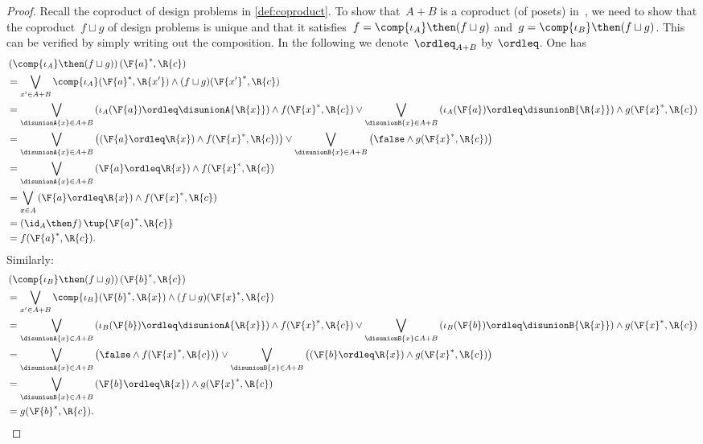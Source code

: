 \begin{proof}
	Recall the coproduct of design problems in \cref{def:coproduct}.
	To show that~$A+B$ is a coproduct (of posets) in~\DP, we need to show that the coproduct~$f \sqcup g$ of design problems is unique and that it satisfies~$f = \comp{\iota_A} \then (f \sqcup g)$ and~$g = \comp{\iota_B} \then (f \sqcup g)$.
	This can be verified by simply writing out the composition.
	In the following we denote~$\ordleq_{A+B}$ by $\ordleq$.
	One has
	\begin{equation}
		\begin{aligned}
			 & \left(\comp{\iota_A}\then (f\sqcup g)\right)(\F{a}^*,\R{c})                               \\&=\bigvee_{x' \in A+B}\comp{\iota_A}(\F{a}^*,\R{x'})\wedge (f\sqcup g)(\F{x'}^*,\R{c})\\
			 & =\bigvee_{\disunionA{x} \in A+B}
			\left(\iota_A(\F{a})\ordleq\disunionA{\R{x}}\right)\wedge  f(\F{x}^*,\R{c})  \vee \bigvee_{\disunionB{x} \in A+B}
			\left(\iota_A(\F{a})\ordleq \disunionB{\R{x}}\right)\wedge  g(\F{x}^*,\R{c})                 \\
			 & =\bigvee_{\disunionA{x} \in A+B}
			\left( \left(\F{a}\ordleq \R{x}\right) \wedge  f(\F{x}^*,\R{c})\right) \vee \bigvee_{\disunionB{x} \in A+B}
			\left( \false \wedge  g(\F{x}^*,\R{c}) \right)                                               \\
			 & =\bigvee_{\disunionA{x} \in A+B} \left(\F{a}\ordleq \R{x}\right) \wedge  f(\F{x}^*,\R{c}) \\
			 & =\bigvee_{x\in A}\left( \F{a}\ordleq \R{x}\right) \wedge f(\F{x}^*,\R{c})                 \\
			 & =\left( \id_A \then f\right)\tup{\F{a}^*,\R{c}}                                           \\
			 & =f(\F{a}^*,\R{c}).
		\end{aligned}
	\end{equation}
	Similarly:
	\begin{equation}
		\begin{aligned}
			 & \left(\comp{\iota_B}\then (f\sqcup g)\right)(\F{b}^*,\R{c})                               \\&=\bigvee_{x' \in A+B}\comp{\iota_B}(\F{b}^*,\R{x})\wedge (f\sqcup g)(\F{x}^*,\R{c})\\
			 & =\bigvee_{\disunionA{x} \in A+B}
			\left(\iota_B(\F{b})\ordleq\disunionA{\R{x}}\right)\wedge  f(\F{x}^*,\R{c})  \vee \bigvee_{\disunionB{x} \in A+B}
			\left(\iota_B(\F{b})\ordleq \disunionB{\R{x}}\right)\wedge  g(\F{x}^*,\R{c})                 \\
			 & =\bigvee_{\disunionA{x} \in A+B}
			\left(\false \wedge  f(\F{x}^*,\R{c})\right) \vee \bigvee_{\disunionB{x} \in A+B}
			\left(\left(\F{b}\ordleq \R{x}\right) \wedge  g(\F{x}^*,\R{c}) \right)                       \\
			 & =\bigvee_{\disunionB{x} \in A+B} \left(\F{b}\ordleq \R{x}\right) \wedge  g(\F{x}^*,\R{c}) \\
			 & =g(\F{b}^*,\R{c}).
		\end{aligned}
	\end{equation}


\end{proof}
